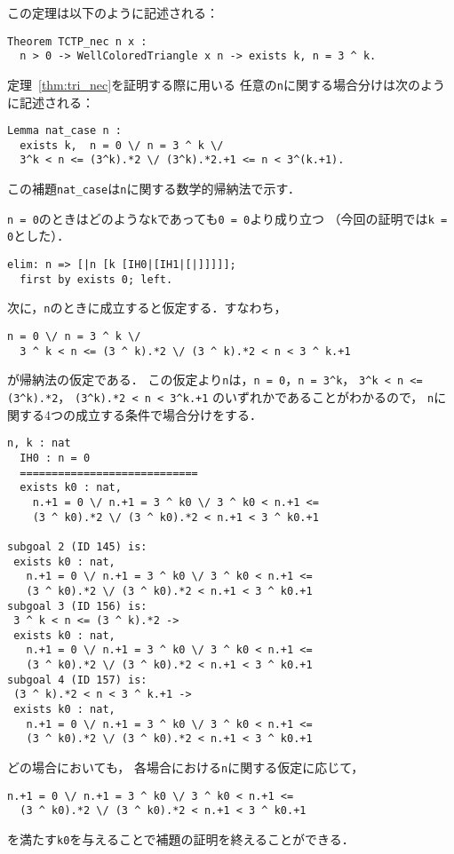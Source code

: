 この定理は以下のように記述される：
\begin{lstlisting}[language=Coq]
  Theorem TCTP_nec n x :
  n > 0 -> WellColoredTriangle x n -> exists k, n = 3 ^ k.
\end{lstlisting}

定理~\ref{thm:tri_nec}を証明する際に用いる
任意の{\tt{n}}に関する場合分けは次のように記述される：
\begin{lstlisting}[language=Coq]
  Lemma nat_case n :
  exists k,  n = 0 \/ n = 3 ^ k \/
  3^k < n <= (3^k).*2 \/ (3^k).*2.+1 <= n < 3^(k.+1).
\end{lstlisting}
この補題{\tt{nat\_case}}は{\tt{n}}に関する数学的帰納法で示す．

{\tt{n = 0}}のときはどのような{\tt{k}}であっても{\tt{0 = 0}}より成り立つ
（今回の証明では{\tt{k = 0}}とした）．
\begin{lstlisting}[language=Coq]
  elim: n => [|n [k [IH0|[IH1|[|]]]]];
  first by exists 0; left.
\end{lstlisting}
次に，{\tt{n}}のときに成立すると仮定する．すなわち，
\begin{lstlisting}[language=Coq]
  n = 0 \/ n = 3 ^ k \/
  3 ^ k < n <= (3 ^ k).*2 \/ (3 ^ k).*2 < n < 3 ^ k.+1
\end{lstlisting}
が帰納法の仮定である．
この仮定より{\tt{n}}は，{\tt{n = 0}}，{\tt{n = 3\verb|^|k}}，
{\tt{3\verb|^|k < n <= (3\verb|^|k).*2}}，
{\tt{(3\verb|^|k).*2 < n < 3\verb|^|k.+1}}
のいずれかであることがわかるので，
{\tt{n}}に関する4つの成立する条件で場合分けをする．
\begin{lstlisting}[language=Coq]
    n, k : nat
  IH0 : n = 0
  ============================
  exists k0 : nat,
    n.+1 = 0 \/ n.+1 = 3 ^ k0 \/ 3 ^ k0 < n.+1 <=
    (3 ^ k0).*2 \/ (3 ^ k0).*2 < n.+1 < 3 ^ k0.+1

subgoal 2 (ID 145) is:
 exists k0 : nat,
   n.+1 = 0 \/ n.+1 = 3 ^ k0 \/ 3 ^ k0 < n.+1 <=
   (3 ^ k0).*2 \/ (3 ^ k0).*2 < n.+1 < 3 ^ k0.+1
subgoal 3 (ID 156) is:
 3 ^ k < n <= (3 ^ k).*2 ->
 exists k0 : nat,
   n.+1 = 0 \/ n.+1 = 3 ^ k0 \/ 3 ^ k0 < n.+1 <=
   (3 ^ k0).*2 \/ (3 ^ k0).*2 < n.+1 < 3 ^ k0.+1
subgoal 4 (ID 157) is:
 (3 ^ k).*2 < n < 3 ^ k.+1 ->
 exists k0 : nat,
   n.+1 = 0 \/ n.+1 = 3 ^ k0 \/ 3 ^ k0 < n.+1 <=
   (3 ^ k0).*2 \/ (3 ^ k0).*2 < n.+1 < 3 ^ k0.+1
\end{lstlisting}
どの場合においても，
各場合における{\tt{n}}に関する仮定に応じて，
\begin{lstlisting}[language=Coq]
  n.+1 = 0 \/ n.+1 = 3 ^ k0 \/ 3 ^ k0 < n.+1 <=
  (3 ^ k0).*2 \/ (3 ^ k0).*2 < n.+1 < 3 ^ k0.+1
\end{lstlisting}
を満たす{\tt{k0}}を与えることで補題の証明を終えることができる．

